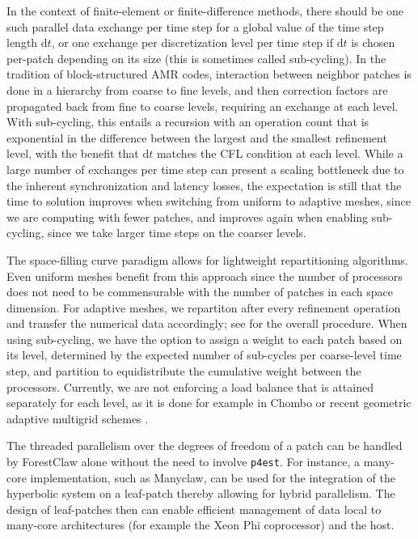 \documentclass{IOS-Book-Article}     %
\newcommand{\dt}{\mathrm{d}t}
\newcommand{\forestclaw}{ForestClaw\xspace}
\newcommand{\pforest}{\texttt{p4est}\xspace}
\newcommand{\manyclaw}{Manyclaw\xspace}
\begin{document}
In the context of finite-element or finite-difference methods, there should be
one such parallel data exchange per time step for a global value of the time
step length $\dt$, or one exchange per discretization level per time step if
$\dt$ is chosen per-patch depending on its size (this is sometimes called
sub-cycling).  In the tradition of block-structured AMR codes, interaction
between neighbor patches is done in a hierarchy from coarse to fine levels, and
then correction factors are propagated back from fine to coarse levels, requiring
an exchange at each level.  With sub-cycling, this entails a recursion with an
operation count that is exponential in the difference between the largest and
the smallest refinement level, with the benefit that $\dt$ matches the CFL
condition at each level.  While a large number of exchanges per time step can
present a scaling bottleneck due to the inherent synchronization and latency
losses, the expectation is still that the time to solution improves when
switching from uniform to adaptive meshes, since we are computing with fewer
patches, and improves again when enabling sub-cycling, since we take larger
time steps on the coarser levels.

The space-filling curve paradigm allows for lightweight repartitioning
algorithms.  Even uniform meshes benefit from this approach since the number of
processors does not need to be commensurable with the number of patches in each
space dimension.  For adaptive meshes, we repartiton after every refinement
operation and transfer the numerical data accordingly; see \cite[Fig.\
4]{BursteddeGhattasStadlerEtAl08} for the overall procedure.  When using
sub-cycling, we have the option to assign a weight to each patch based on its
level, determined by the expected number of sub-cycles per coarse-level time
step, and partition to equidistribute the cumulative weight between the
processors.  Currently, we are not enforcing a load balance that is attained
separately for each level, as it is done for example in Chombo
\cite{ColellaGravesKeenEtAl07} or recent geometric adaptive multigrid schemes
\cite{SundarBirosBursteddeEtAl12}.

The threaded parallelism over the degrees of freedom of a patch can be handled
by \forestclaw alone without the need to involve \pforest.  For instance, a
many-core implementation, such as \manyclaw \cite{manyclaw}, can be used for
the integration of the hyperbolic system on a leaf-patch thereby allowing for
hybrid parallelism.  The design of leaf-patches then can enable efficient
management of data local to many-core architectures (for example the Xeon Phi
coprocessor) and the host.
\end{document}

